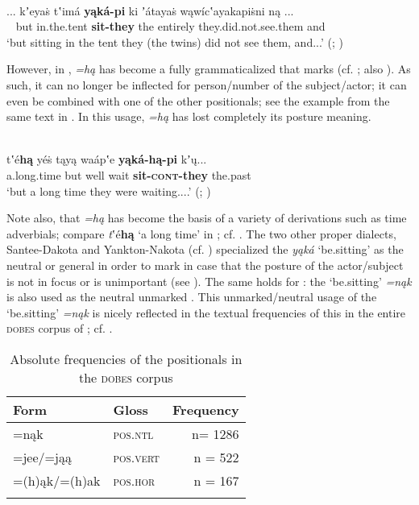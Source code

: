 \documentclass[output=paper]{langsci/langscibook}
\begin{document}
\ea \label{ex:helmbrecht:7}
 \\
\gll ... kʼeya\.{s}  tʽimá \textbf{yąká-pi} ki ʼátaya\.{s}   wąwícʽayakapi\.{s}ni       ną  ...\\
  ~         but       in.the.tent   \textbf{sit-they} the   entirely  they.did.not.see.them  and\\
\glt `but sitting in the tent they (the twins) did not see them, and...' (\citealt[193ff]{Deloria1932};  \citealt[170]{BoasDeloria1941})
\z 

However, in , \textit{=hą} has become a fully grammaticalized  that marks  (cf. \citealt[60f]{BoasDeloria1941}; also \citealt[31]{Ingham2003}). As such, it can no longer be inflected for person\slash number of the subject\slash actor; it can even be combined with one of the other positionals; see the example from the same text in . In this usage, \textit{=hą} has lost completely its posture meaning.\newpage

\ea \label{ex:helmbrecht:8}
 \\
\gll tʽé\textbf{hą}           yé{\.{s}} tąyą waápʽe \textbf{yąká-hą-pi}          kʼ\k{u}...\\
a.long.time but well wait      \textbf{sit-\textsc{cont}-they}  the.past\\
\glt `but a long time they were waiting....' (\citealt[193ff]{Deloria1932}; \citealt[170]{BoasDeloria1941})
\z 


Note also, that \textit{=hą} has become the basis of a variety of derivations such as time adverbials; compare \textit{t}ʽ{é}\textbf{{hą}}\textbf{} `a long time'\textbf{} in ; cf. \citet[60f]{BoasDeloria1941}. The two other  proper dialects, Santee-Dakota and Yankton-Nakota (cf. ) specialized the  \textit{yąká} `be.sitting' as the neutral or general  in order to mark  in case that the posture of the actor\slash subject is not in focus or is unimportant (see \citealt[165]{Deloria1932}). The same holds for : the `be.sitting'  \textit{=nąk} is also used as the neutral unmarked . This unmarked\slash neutral usage of the `be.sitting'  \textit{=nąk} is nicely reflected in the textual frequencies of this  in the entire \textsc{dobes} corpus of ; cf. .

\begin{table}
\begin{tabular}{llr}
\lsptoprule
Form & Gloss & Frequency \\
\midrule
{=nąk} & \textsc{pos.ntl} & n= 1286\\
{=jee}/{=jąą} & \textsc{pos}.\textsc{vert} & n = 522\\
=({h}){ąk}/=({h}){ak} & \textsc{pos}.\textsc{hor} & n = 167\\
\lspbottomrule
\end{tabular}
\caption{Absolute frequencies of the positionals in the \textsc{dobes} corpus}
\label{tab:helmbrecht:9}
\end{table}
\end{document}
